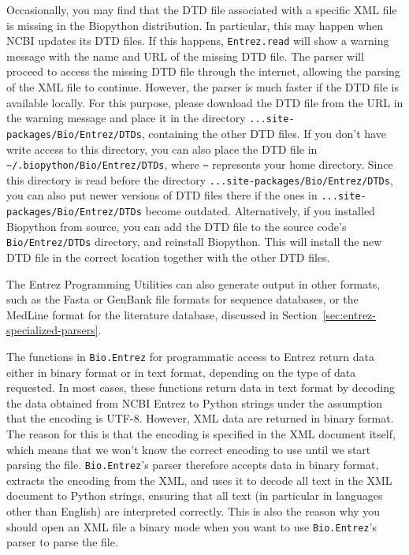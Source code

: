 Occasionally, you may find that the DTD file associated with a specific XML file is missing in the Biopython distribution. In particular, this may happen when NCBI updates its DTD files. If this happens, \verb+Entrez.read+ will show a warning message with the name and URL of the missing DTD file. The parser will proceed to access the missing DTD file through the internet, allowing the parsing of the XML file to continue.  However, the parser is much faster if the DTD file is available locally. For this purpose, please download the DTD file from the URL in the warning message and place it in the directory \verb+...site-packages/Bio/Entrez/DTDs+, containing the other DTD files.  If you don't have write access to this directory, you can also place the DTD file in \verb+~/.biopython/Bio/Entrez/DTDs+, where \verb+~+ represents your home directory. Since this directory is read before the directory \verb+...site-packages/Bio/Entrez/DTDs+, you can also put newer versions of DTD files there if the ones in \verb+...site-packages/Bio/Entrez/DTDs+ become outdated. Alternatively, if you installed Biopython from source, you can add the DTD file to the source code's \verb+Bio/Entrez/DTDs+ directory, and reinstall Biopython. This will install the new DTD file in the correct location together with the other DTD files.

The Entrez Programming Utilities can also generate output in other formats, such as the Fasta or GenBank file formats for sequence databases, or the MedLine format for the literature database, discussed in Section~\ref{sec:entrez-specialized-parsers}.

The functions in \verb+Bio.Entrez+ for programmatic access to Entrez return data either in binary format or in text format, depending on the type of data requested. In most cases, these functions return data in text format by decoding the data obtained from NCBI Entrez to Python strings under the assumption that the encoding is UTF-8. However, XML data are returned in binary format. The reason for this is that the encoding is specified in the XML document itself, which means that we won't know the correct encoding to use until we start parsing the file. \verb+Bio.Entrez+'s parser therefore accepts data in binary format, extracts the encoding from the XML, and uses it to decode all text in the XML document to Python strings, ensuring that all text (in particular in languages other than English) are interpreted correctly. This is also the reason why you should open an XML file a binary mode when you want to use \verb+Bio.Entrez+'s parser to parse the file.

